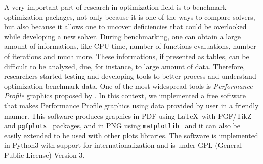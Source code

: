 A very important part of research in optimization field is to benchmark
optimization packages, not only because it is one of the ways to compare
solvers, but also because it allows one to uncover deficiencies that could
be overlooked while developing a new solver. During benchmarking, one can
obtain a large amount of  informations, like CPU time, number of functions
evaluations, number of iterations and much more. These informations, if
presented as tables, can be difficult to be analyzed, due, for instance, to
large amount of data.  Therefore, researchers started testing and developing
tools to better process and understand optimization benchmark data. One of
the most widespread tools is \emph{Performance Profile} graphics proposed by
\textcite{Dolan:2002du}. In this context, we implemented a free software
that makes Performance Profile graphics using data provided by user in a
friendly manner. This software produces graphics in PDF using \LaTeX\ with
PGF/TikZ~\cite{TikZ} and \texttt{pgfplots}~\cite{pgfplots} packages, and in
PNG using \texttt{matplotlib}~\cite{Hunter:2007} and it can also be easily
extended to be used with other plots libraries. The software is implemented
in Python3 with support for internationalization and is under GPL (General
Public License) Version 3.

